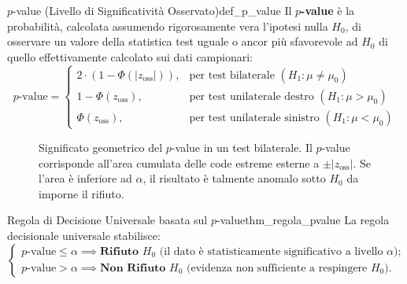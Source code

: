 \begin{definizione}{$p$-value (Livello di Significatività Osservato)}{def_p_value}
Il \textbf{$p$-value} è la probabilità, calcolata assumendo rigorosamente vera l'ipotesi nulla $H_0$, di osservare un valore della statistica test uguale o ancor più sfavorevole ad $H_0$ di quello effettivamente calcolato sui dati campionari:
\begin{equation}
    p\text{-value} = \begin{cases}
        2 \cdot \left(1 - \Phi(|z_{\text{oss}}|)\right), & \text{per test bilaterale } (H_1: \mu \neq \mu_0) \\
        1 - \Phi(z_{\text{oss}}), & \text{per test unilaterale destro } (H_1: \mu > \mu_0) \\
        \Phi(z_{\text{oss}}), & \text{per test unilaterale sinistro } (H_1: \mu < \mu_0)
    \end{cases}
\end{equation}
\end{definizione}

\begin{figure}[htbp]
    \centering
    
    \caption{Significato geometrico del $p$-value in un test bilaterale. Il $p$-value corrisponde all'area cumulata delle code estreme esterne a $\pm |z_{\text{oss}}|$. Se l'area è inferiore ad $\alpha$, il risultato è talmente anomalo sotto $H_0$ da imporne il rifiuto.}
    \label{fig:p_value_interpretazione}
\end{figure}

\begin{teorema}{Regola di Decisione Universale basata sul $p$-value}{thm_regola_pvalue}
La regola decisionale universale stabilisce:
\begin{equation}
    \begin{cases}
        p\text{-value} \le \alpha \implies \textbf{Rifiuto } H_0 \text{ (il dato è statisticamente significativo a livello } \alpha); \\
        p\text{-value} > \alpha \implies \textbf{Non Rifiuto } H_0 \text{ (evidenza non sufficiente a respingere } H_0).
    \end{cases}
\end{equation}
\end{teorema}

